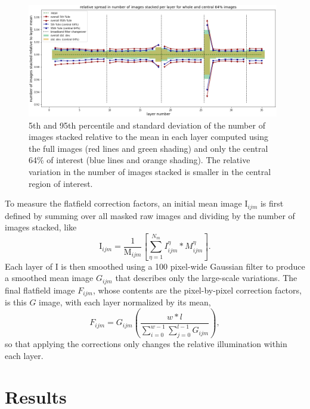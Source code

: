 \documentclass[letterpaper,11pt]{article}
\newcommand{\Iota}{\mathrm{I}}
\newcommand{\Mu}{\mathrm{M}}
\begin{document}
\begin{figure}[!ht]
\centering
\includegraphics[width=0.98\textwidth]{images/measuring_flatfield_corrections/mask_stack_variation_reduction_vectra}
\caption{\footnotesize 5th and 95th percentile and standard deviation of the number of images stacked relative to the mean in each layer computed using the full images (red lines and green shading) and only the central 64\% of interest (blue lines and orange shading). The relative variation in the number of images stacked is smaller in the central region of interest.}
\label{fig:removing_image_edges_effect_on_mask_stacks}
\end{figure} 

To measure the flatfield correction factors, an initial mean image $\Iota_{ijm}$ is first defined by summing over all masked raw images and dividing by the number of images stacked, like
\begin{equation}
\Iota_{ijm} = \frac{1}{\Mu_{ijm}} \left[ \sum_{\eta=1}^{N_{m}} I^{\eta}_{ijm}*M^{\eta}_{ijm} \right] .
\end{equation}
Each layer of $\Iota$ is then smoothed using a 100 pixel-wide Gaussian filter to produce a smoothed mean image $G_{ijm}$ that describes only the large-scale variations. The final flatfield image $F_{ijm}$, whose contents are the pixel-by-pixel correction factors, is this $G$ image, with each layer normalized by its mean,
\begin{equation}
F_{ijm} = G_{ijm} \left( \frac{w*l}{\sum_{i=0}^{w-1}\sum_{j=0}^{l-1}G_{ijm}} \right) ,
\end{equation}
so that applying the corrections only changes the relative illumination within each layer. 

\section{Results}
\label{sec:results}
\end{document}
